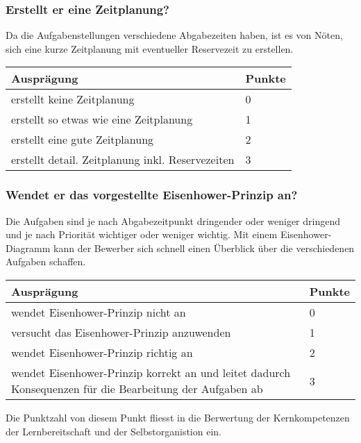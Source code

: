 \subsubsection{Erstellt er eine Zeitplanung?}
Da die Aufgabenstellungen verschiedene Abgabezeiten haben, ist es von Nöten, sich eine kurze Zeitplanung mit eventueller Reservezeit zu erstellen.


\begin{center}
  \begin{tabular}{ | p{7cm} | p{1cm} |}
   \hline
   \textbf{Ausprägung} & \textbf{Punkte} \\ \hline
   erstellt keine Zeitplanung & 0 \\ \hline
   erstellt so etwas wie eine Zeitplanung & 1 \\ \hline
   erstellt eine gute Zeitplanung & 2 \\ \hline
   erstellt detail. Zeitplanung inkl. Reservezeiten  & 3\\ \hline
  \end{tabular}
\end{center}

\subsubsection{Wendet er das vorgestellte Eisenhower-Prinzip an?}
Die Aufgaben sind je nach Abgabezeitpunkt dringender oder weniger dringend und je nach Priorität wichtiger oder weniger wichtig. Mit einem Eisenhower-Diagramm kann der Bewerber sich schnell einen Überblick über die verschiedenen Aufgaben schaffen.

\begin{center}
  \begin{tabular}{ | p{7cm} | p{1cm} |}
   \hline
   \textbf{Ausprägung} & \textbf{Punkte} \\ \hline
   wendet Eisenhower-Prinzip nicht an & 0 \\ \hline
   versucht das Eisenhower-Prinzip anzuwenden & 1 \\ \hline
   wendet Eisenhower-Prinzip richtig an & 2 \\ \hline
   wendet Eisenhower-Prinzip korrekt an und leitet dadurch Konsequenzen für die Bearbeitung der Aufgaben ab  & 3\\ \hline
  \end{tabular}
\end{center}

Die Punktzahl von diesem Punkt fliesst in die Berwertung der Kernkompetenzen der Lernbereitschaft und der Selbstorganistion ein.

